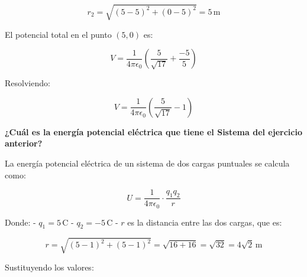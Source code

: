 \documentclass[12pt, answers]{exam} %
\begin{document}
\begin{questions}
        \[
        r_2 = \sqrt{(5-5)^2 + (0-5)^2} = 5 \, \text{m}
        \]
        
        El potencial total en el punto \( (5,0) \) es:
        
        \[
        V = \frac{1}{4 \pi \epsilon_0} \left( \frac{5}{\sqrt{17}} + \frac{-5}{5} \right)
        \]
        
        Resolviendo:
        
        \[
        V = \frac{1}{4 \pi \epsilon_0} \left( \frac{5}{\sqrt{17}} - 1 \right)
        \]
        
        
        
        

    \question \large\textbf{¿Cuál es la energía potencial eléctrica que tiene el Sistema del ejercicio anterior?}

    
        La energía potencial eléctrica de un sistema de dos cargas puntuales se calcula como:
        
        \[
        U = \frac{1}{4 \pi \epsilon_0} \cdot \frac{q_1 q_2}{r}
        \]
        
        Donde:
        - \( q_1 = 5 \, \text{C} \)
        - \( q_2 = -5 \, \text{C} \)
        - \( r \) es la distancia entre las dos cargas, que es:
        
        \[
        r = \sqrt{(5-1)^2 + (5-1)^2} = \sqrt{16 + 16} = \sqrt{32} = 4\sqrt{2} \, \text{m}
        \]
        
        Sustituyendo los valores:
        

\end{questions}
\end{document}
